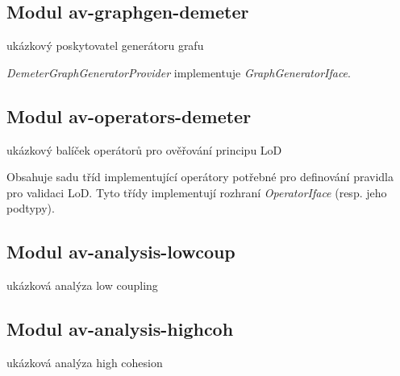 \subsection{Modul av-graphgen-demeter}
ukázkový poskytovatel generátoru grafu

\emph{DemeterGraphGeneratorProvider} implementuje \emph{GraphGeneratorIface}.


\subsection{Modul av-operators-demeter}
ukázkový balíček operátorů pro ověřování principu LoD

Obsahuje sadu tříd implementující operátory potřebné pro definování pravidla pro validaci LoD. Tyto třídy implementují rozhraní \emph{OperatorIface} (resp. jeho podtypy).

\subsection{Modul av-analysis-lowcoup}
ukázková analýza low coupling

\subsection{Modul av-analysis-highcoh}
ukázková analýza high cohesion

